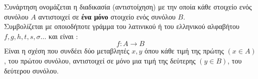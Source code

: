 Συνάρτηση ονομάζεται η διαδικασία (αντιστοίχηση) με την οποία κάθε στοιχείο ενός συνόλου $ A $ αντιστοιχεί σε \textbf{ένα μόνο} στοιχείο ενός συνόλου $ B $.\\Συμβολίζεται με οποιοδήποτε γράμμα του λατινικού ή του ελληνικού αλφαβήτου $ f, g, h, t, s, \sigma\ldots $ και είναι : \[ f:A\rightarrow B \]
Είναι η σχέση που συνδέει δύο μεταβλητές $ x,y $ όπου κάθε τιμή της πρώτης $ (x\in A) $, του πρώτου συνόλου, αντιστοιχεί σε μόνο μια τιμή της δεύτερης $ (y\in B) $, του δεύτερου συνόλου.\vspace{-3mm}
\begin{center}
\begin{figure}[h]
\centering
{}
\end{figure}
\end{center}
\vspace{-1.1cm}
